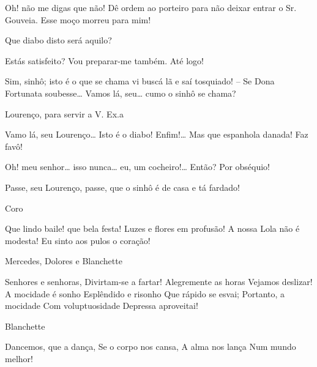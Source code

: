  Oh! não me digas que não!  Dê ordem ao
porteiro para não deixar entrar o Sr. Gouveia. Esse moço morreu para mim!

  Que diabo disto será aquilo?

  Estás satisfeito?  Vou
preparar-me também. Até logo! 


  Sim, sinhô; isto é o que se chama vi buscá lã e saí
tosquiado! -- Se Dona Fortunata soubesse\ldots{}  Vamos lá, seu\ldots{}
cumo o sinhô se chama?

 Lourenço, para servir a V. Ex.a

 Vamo lá, seu Lourenço\ldots{}  Isto é o
diabo! Enfim!\ldots{} Mas que espanhola danada!  Faz favô!

  Oh! meu senhor\ldots{} isso nunca\ldots{} eu, um
cocheiro!\ldots{} Então? Por obséquio!

 Passe, seu Lourenço, passe, que o sinhô é de casa e tá fardado!




 

 Coro

 Que lindo baile! que bela festa!
 Luzes e flores em profusão!
 A nossa Lola não é modesta!
 Eu sinto aos pulos o coração!

 Mercedes, Dolores e Blanchette

 Senhores e senhoras,
 Divirtam-se a fartar!
 Alegremente as horas
 Vejamos deslizar!
 A mocidade é sonho
 Esplêndido e risonho
 Que rápido se esvai;
 Portanto, a mocidade
 Com voluptuosidade
 Depressa aproveitai!

 Blanchette

 Dancemos, que a dança,
 Se o corpo nos cansa,
 A alma nos lança
 Num mundo melhor!

